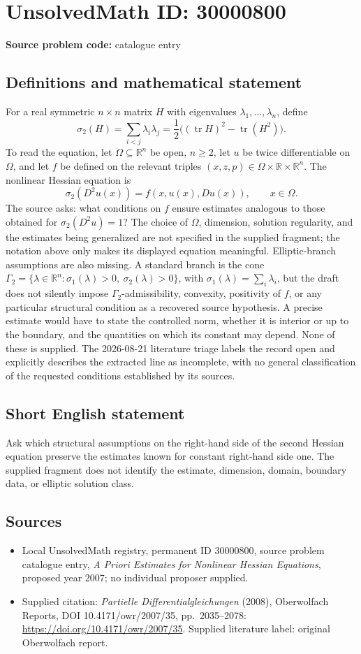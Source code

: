 \documentclass[11pt]{article}
\newcommand{\R}{\mathbb{R}}
\begin{document}
\section*{UnsolvedMath ID: 30000800}
\textbf{Source problem code:} catalogue entry
\subsection{Definitions and mathematical statement}
For a real symmetric $n\times n$ matrix $H$ with eigenvalues $\lambda_1,\ldots,\lambda_n$, define \[\sigma_2(H)=\sum_{i<j}\lambda_i\lambda_j=\frac12\bigl((\operatorname{tr}H)^2-\operatorname{tr}(H^2)\bigr).\] To read the equation, let $\Omega\subseteq\R^n$ be open, $n\geq2$, let $u$ be twice differentiable on $\Omega$, and let $f$ be defined on the relevant triples $(x,z,p)\in\Omega\times\R\times\R^n$. The nonlinear Hessian equation is \[\sigma_2(D^2u(x))=f(x,u(x),Du(x)),\qquad x\in\Omega.\] The source asks: what conditions on $f$ ensure estimates analogous to those obtained for $\sigma_2(D^2u)=1$? The choice of $\Omega$, dimension, solution regularity, and the estimates being generalized are not specified in the supplied fragment; the notation above only makes its displayed equation meaningful. Elliptic-branch assumptions are also missing. A standard branch is the cone $\Gamma_2=\{\lambda\in\R^n:\sigma_1(\lambda)>0,\ \sigma_2(\lambda)>0\}$, with $\sigma_1(\lambda)=\sum_i\lambda_i$, but the draft does not silently impose $\Gamma_2$-admissibility, convexity, positivity of $f$, or any particular structural condition as a recovered source hypothesis. A precise estimate would have to state the controlled norm, whether it is interior or up to the boundary, and the quantities on which its constant may depend. None of these is supplied. The 2026-08-21 literature triage labels the record open and explicitly describes the extracted line as incomplete, with no general classification of the requested conditions established by its sources.
\subsection{Short English statement}
Ask which structural assumptions on the right-hand side of the second Hessian equation preserve the estimates known for constant right-hand side one. The supplied fragment does not identify the estimate, dimension, domain, boundary data, or elliptic solution class.
\subsection{Sources}
\begin{itemize}\item Local UnsolvedMath registry, permanent ID 30000800, source problem catalogue entry, \emph{A Priori Estimates for Nonlinear Hessian Equations}, proposed year 2007; no individual proposer supplied.\item Supplied citation: \emph{Partielle Differentialgleichungen} (2008), Oberwolfach Reports, DOI 10.4171/owr/2007/35, pp.\ 2035--2078: \url{https://doi.org/10.4171/owr/2007/35}. Supplied literature label: original Oberwolfach report.\end{itemize}
\end{document}
